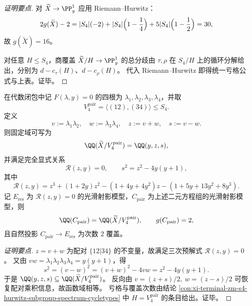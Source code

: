\begin{proof}[证明要点]
对 \(\widetilde{X}\to\PP^1_y\) 应用 Riemann--Hurwitz：
\[
2g(\widetilde{X})-2
=|S_4|(-2)+|S_4|\Bigl(1-\frac14\Bigr)+5|S_4|\Bigl(1-\frac12\Bigr)=30,
\]
故 \(g(\widetilde{X})=16\)。

对任意 \(H\le S_4\)，商覆盖 \(\widetilde{X}/H\to\PP^1_y\) 的总分歧由 \(\tau,\rho\) 在 \(S_4/H\) 上的循环分解给出，分别为 \(d-c_\tau(H)\)、\(d-c_\rho(H)\)。
代入 Riemann--Hurwitz 即得统一亏格公式与上表。证毕。
\end{proof}

\begin{conclusion}\label{con:xi-terminal-zm-s4-v4pair-explicit-model}
在代数闭包中记 \(F(\lambda,y)=0\) 的四根为 \(\lambda_1,\lambda_2,\lambda_3,\lambda_4\)，并取
\[
V_4^{\mathrm{pair}}=\langle(12),(34)\rangle\le S_4.
\]
定义
\[
v:=\lambda_1\lambda_2,\quad w:=\lambda_3\lambda_4,\quad z:=v+w,\quad s:=v-w.
\]
则固定域可写为
\[
\QQ(\widetilde{X}/V_4^{\mathrm{pair}})=\QQ(y,z,s),
\]
并满足完全显式关系
\[
\mathscr R(z,y)=0,\qquad s^2=z^2-4y(y+1),
\]
其中
\[
\mathscr R(z,y)=z^3+(1+2y)z^2-(1+4y+4y^2)z-(1+5y+13y^2+8y^3).
\]
记 \(E_{\mathrm{res}}\) 为 \(\mathscr R(z,y)=0\) 的光滑射影模型，\(C_{\mathrm{pair}}\) 为上述二元方程组的光滑射影模型，则
\[
\QQ(C_{\mathrm{pair}})=\QQ(\widetilde{X}/V_4^{\mathrm{pair}}),\qquad
g(C_{\mathrm{pair}})=2,
\]
且自然投影 \(C_{\mathrm{pair}}\to E_{\mathrm{res}}\) 为次数 \(2\) 覆盖。
\end{conclusion}
\begin{proof}[证明要点]
\(z=v+w\) 为配对 \(\{12|34\}\) 的不变量，故满足三次预解式 \(\mathscr R(z,y)=0\)。
又由 \(vw=\lambda_1\lambda_2\lambda_3\lambda_4=y(y+1)\)，得
\[
s^2=(v-w)^2=(v+w)^2-4vw=z^2-4y(y+1).
\]
于是 \(\QQ(y,z,s)\subseteq \QQ(\widetilde{X}/V_4^{\mathrm{pair}})\)。
反向由 \(v=(z+s)/2,\ w=(z-s)/2\) 可恢复配对乘积信息，故函数域相等。
亏格与覆盖次数由结论 \ref{con:xi-terminal-zm-s4-hurwitz-subgroup-spectrum-cycletypes} 中 \(H=V_4^{\mathrm{pair}}\) 的条目给出。证毕。
\end{proof}

